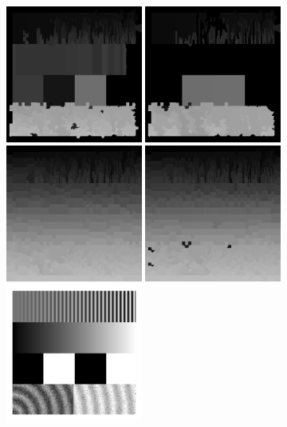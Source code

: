 \documentclass[
  12pt,
  openany]{book}
\begin{document}
\begin{figure}

{\centering \includegraphics[width=0.4\textwidth]{../imgs/ncuts_5_2000_1.0_10_20} \includegraphics[width=0.4\textwidth]{../imgs/ncuts_5_2000_1.0_100_100} \includegraphics[width=0.4\textwidth]{../imgs/ncuts_5_2000_500.0_10_100} \includegraphics[width=0.4\textwidth]{../imgs/ncuts_5_2000_500.0_100_20} \includegraphics[width=0.4\textwidth]{../imgs/geometric} 

}
\end{figure}
\end{document}
